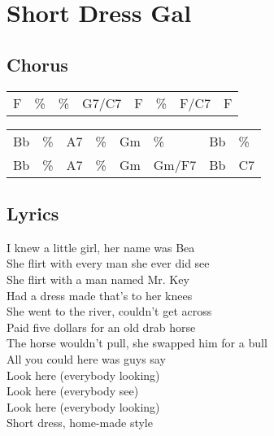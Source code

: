 \section{Short Dress Gal}


\subsection*{Chorus}


\begin{tabular}{l l l l l l l l}
F & \% & \% & G7/C7 & F & \% & F/C7 & F \\ 
\end{tabular}


\begin{tabular}{l l l l l l l l}
Bb & \% & A7 & \% & Gm & \% & Bb & \% \\ 
Bb & \% & A7 & \% & Gm & Gm/F7 & Bb & C7 \\ 
\end{tabular}


\subsection*{Lyrics}


I knew a little girl, her name was Bea \\ 
She flirt with every man she ever did see \\ 
She flirt with a man named Mr. Key \\ 
Had a dress made that's to her knees \\ 

She went to the river, couldn't get across \\ 
Paid five dollars for an old drab horse \\ 
The horse wouldn't pull, she swapped him for a bull \\ 
All you could here was guys say \\ 

Look here (everybody looking) \\ 
Look here (everybody see) \\ 
Look here (everybody looking) \\ 
Short dress, home-made style \\ 

